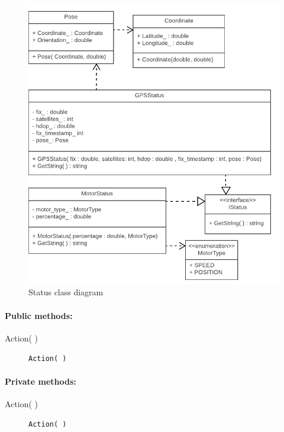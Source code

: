 \begin{figure}[H]
\centering
\includegraphics[width=1\linewidth]{Images/Design/Status_class_diagram}
\caption{Status class diagram}
\label{fig:status}
\end{figure}

\paragraph{Public methods:}
\begin{adjustwidth}{2.5em}{0pt}\begin{description}
		\item [Action( )] \texttt{Action( )}
\end{description}\end{adjustwidth}

\paragraph{Private methods:}
\begin{adjustwidth}{2.5em}{0pt}\begin{description}
		\item [Action( )] \texttt{Action( )}
\end{description}\end{adjustwidth}

